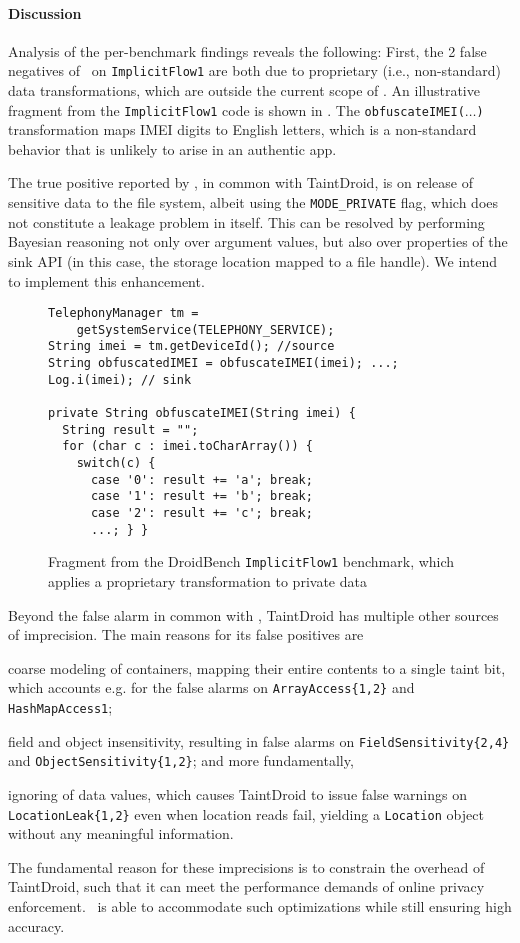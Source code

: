 \paragraph{Discussion}
Analysis of the per-benchmark findings reveals the following: 
First, the 2 false negatives of
\Tool\ on {\tt ImplicitFlow1} are both due to proprietary (i.e., non-standard) data transformations, which are outside the current scope of \Tool. An illustrative fragment from the {\tt ImplicitFlow1} code is shown in . The {\tt obfuscateIMEI($\ldots$)} transformation maps IMEI digits to English letters, which is a non-standard behavior that is unlikely to arise in an authentic app.

The true positive reported by \Tool, in common with TaintDroid, is on release of sensitive data to the file system, albeit using the {\tt MODE\_PRIVATE} flag, which does not constitute a leakage problem in itself. This can be resolved by performing Bayesian reasoning not only over argument values, but also over properties of the sink API (in this case, the storage location mapped to a file handle). We intend to implement this enhancement.

\begin{figure}
\begin{lstlisting}
TelephonyManager tm =
    getSystemService(TELEPHONY_SERVICE);
String imei = tm.getDeviceId(); //source
String obfuscatedIMEI = obfuscateIMEI(imei); ...;
Log.i(imei); // sink

private String obfuscateIMEI(String imei) {
  String result = "";
  for (char c : imei.toCharArray()) {
    switch(c) {
      case '0': result += 'a'; break;
      case '1': result += 'b'; break;
      case '2': result += 'c'; break;
      ...; } }
\end{lstlisting}
\caption{\label{Fi:dataTransform} Fragment from the DroidBench {\tt ImplicitFlow1} benchmark, which applies a proprietary transformation to private data}
\end{figure}


Beyond the false alarm in common with \Tool, TaintDroid has multiple other sources of imprecision. The main reasons for its false positives are
\begin{compactitem}
	\item coarse modeling of containers, mapping their entire contents to a single taint bit, which accounts e.g. for the false alarms on {\tt ArrayAccess\{1,2\}} and {\tt HashMapAccess1};
	\item field and object insensitivity, resulting in false alarms on {\tt FieldSensitivity\{2,4\}} and {\tt ObjectSensitivity\{1,2\}}; and more fundamentally,
	\item ignoring of data values, which causes TaintDroid to issue false warnings on {\tt LocationLeak\{1,2\}} even when location reads fail, yielding a {\tt Location} object without any meaningful information.
\end{compactitem}
The fundamental reason for these imprecisions is to constrain the overhead of TaintDroid, such that it can meet the performance demands of online privacy enforcement. \Tool\ is able to accommodate such optimizations while still ensuring high accuracy. 